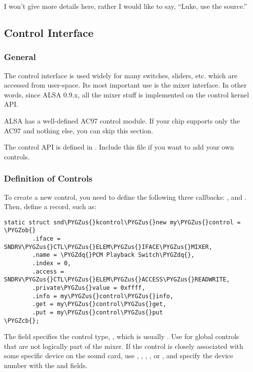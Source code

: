 \documentclass[a4paper,8pt,english]{sphinxmanual}
\def\PYGZus{\char`\_}
\def\PYGZob{\char`\{}
\def\PYGZcb{\char`\}}
\def\PYGZdq{\char`\"}
\begin{document}
I won't give more details here, rather I would like to say, “Luke, use
the source.”


\subsection{Control Interface}
\label{sound/kernel-api/writing-an-alsa-driver:control-interface}

\subsubsection{General}
\label{sound/kernel-api/writing-an-alsa-driver:id4}
The control interface is used widely for many switches, sliders, etc.
which are accessed from user-space. Its most important use is the mixer
interface. In other words, since ALSA 0.9.x, all the mixer stuff is
implemented on the control kernel API.

ALSA has a well-defined AC97 control module. If your chip supports only
the AC97 and nothing else, you can skip this section.

The control API is defined in . Include this file
if you want to add your own controls.


\subsubsection{Definition of Controls}
\label{sound/kernel-api/writing-an-alsa-driver:definition-of-controls}
To create a new control, you need to define the following three
callbacks: ,  and . Then, define a
 record, such as:

\begin{Verbatim}[commandchars=\\\{\}]
static struct snd\PYGZus{}kcontrol\PYGZus{}new my\PYGZus{}control = \PYGZob{}
        .iface = SNDRV\PYGZus{}CTL\PYGZus{}ELEM\PYGZus{}IFACE\PYGZus{}MIXER,
        .name = \PYGZdq{}PCM Playback Switch\PYGZdq{},
        .index = 0,
        .access = SNDRV\PYGZus{}CTL\PYGZus{}ELEM\PYGZus{}ACCESS\PYGZus{}READWRITE,
        .private\PYGZus{}value = 0xffff,
        .info = my\PYGZus{}control\PYGZus{}info,
        .get = my\PYGZus{}control\PYGZus{}get,
        .put = my\PYGZus{}control\PYGZus{}put
\PYGZcb{};
\end{Verbatim}

The  field specifies the control type,
, which is usually . Use 
for global controls that are not logically part of the mixer. If the
control is closely associated with some specific device on the sound
card, use , , , , or ,
and specify the device number with the  and 
fields.
\end{document}
